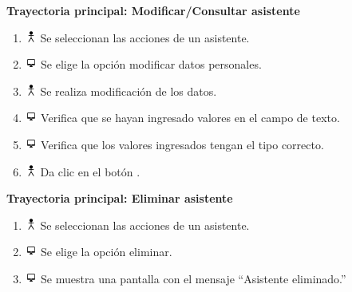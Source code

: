 \textbf{Trayectoria principal: Modificar/Consultar asistente}        
\begin{enumerate}
\item \includegraphics[height=1em]{pictures/actor.png} Se seleccionan las acciones de un asistente.
\item \includegraphics[height=1em]{pictures/sistema.png} Se elige la opción modificar datos personales.
\item \includegraphics[height=1em]{pictures/actor.png} Se realiza modificación de los datos.
\item \includegraphics[height=1em]{pictures/sistema.png} Verifica que se hayan ingresado valores en el campo de texto.
\item \includegraphics[height=1em]{pictures/sistema.png} Verifica que los valores ingresados tengan el tipo correcto.
\item \includegraphics[height=1em]{pictures/actor.png} Da clic en el botón .
\end{enumerate} \bigskip

\textbf{Trayectoria principal: Eliminar asistente}        
\begin{enumerate}
\item \includegraphics[height=1em]{pictures/actor.png} Se seleccionan las acciones de un asistente.
\item \includegraphics[height=1em]{pictures/sistema.png} Se elige la opción eliminar.
\item \includegraphics[height=1em]{pictures/sistema.png} Se muestra una pantalla con el mensaje ``Asistente eliminado.''
\end{enumerate} \bigskip


